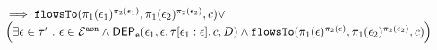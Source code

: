 \begin{lem}
\[\begin{array}{l}
			\\ \quad 
			\implies 
			\mathtt{flowsTo}(\pi_1(\mathtt{\epsilon}_1)^{\pi_2(\mathtt{\epsilon}_1)}, \pi_1(\mathtt{\epsilon}_2)^{\pi_2(\mathtt{\epsilon}_2)}, c) \lor
			\\ \quad 
			\Big( 
			\exists \mathtt{\epsilon} \in \mathtt{\tau}' ~.~  
			\mathtt{\epsilon} \in \mathcal{E}^{\mathtt{{asn}}} \land
				\mathsf{DEP_{\mathtt{e}}}(\mathtt{\epsilon}_1, \mathtt{\epsilon}, \mathtt{\tau}[\mathtt{\epsilon}_1:\mathtt{\epsilon}], c, D)
				\land 
				\mathtt{flowsTo}(\pi_1(\mathtt{\epsilon})^{\pi_2(\mathtt{\epsilon})}, \pi_1(\mathtt{\epsilon}_2)^{\pi_2(\mathtt{\epsilon}_2)}, c)
			\Big) 
		\end{array}
		\]
\end{lem}
%
